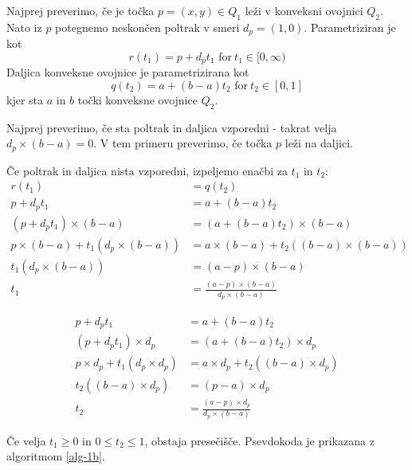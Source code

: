\documentclass{article}
\begin{document}
Najprej preverimo, če je točka $p = (x, y) \in Q_1$ leži v konveksni ovojnici
$Q_2$. Nato iz $p$ potegnemo neskončen poltrak v smeri $d_p = (1, 0)$.
Parametriziran je kot
\begin{equation*}
	r(t_1) = p + d_p t_1 \text{  for}\ t_1 \in [0, \infty)
\end{equation*}
Daljica konveksne ovojnice je parametrizirana kot
\begin{equation*}
	q(t_2) = a + (b - a) t_2 \text{ for}\ t_2 \in [0, 1]
\end{equation*}
kjer sta $a$ in $b$ točki konveksne ovojnice $Q_2$.

Najprej preverimo, če sta poltrak in daljica vzporedni - takrat velja $d_p \times
(b - a) = 0$. V tem primeru preverimo, če točka $p$ leži na daljici.

Če poltrak in daljica nista vzporedni, izpeljemo enačbi za $t_1$ in $t_2$:
\begin{align*}
	r(t_1) &= q(t_2) \\
	p + d_p t_1 &= a + (b - a) t_2 \\
	(p + d_p t_1) \times (b - a) &= (a + (b - a) t_2) \times (b - a) \\
	p \times (b - a) + t_1 (d_p \times (b - a)) &= a \times (b - a) + t_2 ((b - a) \times (b - a)) \\
	t_1 (d_p \times (b - a)) &= (a - p) \times (b - a) \\
	t_1 &= \frac{(a - p) \times (b - a)}{d_p \times (b - a)}
\end{align*}

\begin{align*}
	p + d_p t_1 &= a + (b - a) t_2 \\
	(p + d_p t_1) \times d_p &= (a + (b - a) t_2) \times d_p \\
	p \times d_p + t_1 (d_p \times d_p) &= a \times d_p + t_2 ((b - a) \times d_p) \\
	t_2 ((b - a) \times d_p) &= (p - a) \times d_p \\
	t_2 &= \frac{(a - p) \times d_p}{d_p \times (b - a)}
\end{align*}

Če velja $t_1 \geq 0$ in $0 \leq t_2 \leq 1$, obstaja presečišče. Psevdokoda je
prikazana z algoritmom \ref{alg-1b}.
\end{document}
